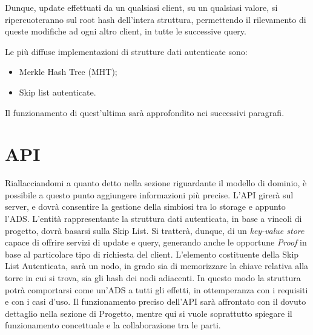 		Dunque, update effettuati da un qualsiasi client, su un qualsiasi valore, si ripercuoteranno sul root hash dell'intera struttura, permettendo il rilevamento di queste modifiche ad ogni altro client, in tutte le successive query.
		
		Le più diffuse implementazioni di strutture dati autenticate sono:
		
		\begin{itemize}
			\item Merkle Hash Tree (MHT);
			\item Skip list autenticate.
		\end{itemize}
	
		Il funzionamento di quest'ultima sarà approfondito nei successivi paragrafi.
	
\section{API}

%	

	Riallacciandomi a quanto detto nella sezione riguardante il modello di dominio, è possibile a questo punto aggiungere informazioni più precise. L'API girerà sul server, e dovrà consentire la gestione della simbiosi tra lo storage e appunto l'ADS. L'entità rappresentante la struttura dati autenticata, in base a vincoli di progetto, dovrà basarsi sulla Skip List. Si tratterà, dunque, di un \textit{key-value store} capace di offrire servizi di update e query, generando anche le opportune \textit{Proof} in base al particolare tipo di richiesta del client. L'elemento costituente della Skip List Autenticata, sarà un nodo, in grado sia di memorizzare la chiave relativa alla torre in cui si trova, sia gli hash dei nodi adiacenti. In questo modo la struttura potrà comportarsi come un'ADS a tutti gli effetti, in ottemperanza con i requisiti e con i casi d'uso. Il funzionamento preciso dell'API sarà affrontato con il dovuto dettaglio nella sezione di Progetto, mentre qui si vuole soprattutto spiegare il funzionamento concettuale e la collaborazione tra le parti.
	
